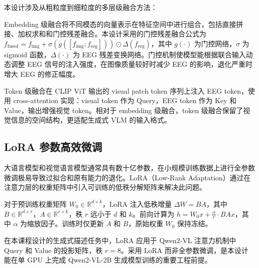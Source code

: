 本设计涉及从粗粒度到细粒度的多层级融合方法：

Embedding 级融合将不同模态的向量表示在特征空间中进行组合，包括直接拼接、加权求和和门控残差融合。本设计采用的门控残差融合公式为 $f_{\mathrm{fused}} = f_{\mathrm{img}} + \sigma(g([f_{\mathrm{img}}; f_{\mathrm{eeg}}])) \odot \Delta(f_{\mathrm{eeg}})$，其中 $g(\cdot)$ 为门控网络，$\sigma$ 为 sigmoid 函数，$\Delta(\cdot)$ 为 EEG 残差变换网络。门控机制使模型能根据联合输入动态调整 EEG 信号的注入强度，在图像质量较好时减少 EEG 的影响，退化严重时增大 EEG 的修正幅度。

Token 级融合在 CLIP ViT 输出的 visual patch token 序列上注入 EEG token，使用 cross-attention 实现：visual token 作为 Query，EEG token 作为 Key 和 Value，输出增强视觉 token。相对于 embedding 级融合，token 级融合保留了视觉信息的空间结构，更适配生成式 VLM 的输入格式。

\subsection{LoRA 参数高效微调}

大语言模型和视觉语言模型通常具有数十亿参数，在小规模训练数据上进行全参数微调极易导致过拟合和原有能力的退化。LoRA（Low-Rank Adaptation）通过在注意力层的权重矩阵中引入可训练的低秩分解矩阵来解决此问题。

对于预训练权重矩阵 $W_0 \in \mathbb{R}^{d\times k}$，LoRA 注入低秩增量 $\Delta W = BA$，其中 $B \in \mathbb{R}^{d\times r}$，$A \in \mathbb{R}^{r\times k}$，秩 $r$ 远小于 $d$ 和 $k$。前向计算为 $h = W_0 x + \frac{\alpha}{r} \cdot BA x$，其中 $\alpha$ 为缩放因子。训练时仅更新 $A$ 和 $B$，原始权重 $W_0$ 保持冻结。

在本课程设计的生成式描述任务中，LoRA 应用于 Qwen2-VL 注意力机制中 Query 和 Value 的投影矩阵，秩 $r=8$。采用 LoRA 而非全参数微调，是本设计能在单 GPU 上完成 Qwen2-VL-2B 生成模型训练的重要工程前提。

